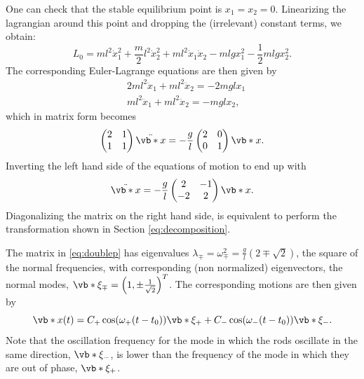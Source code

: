 \documentclass[english,fontsize=11pt,paper=b5]{scrbook}
\theoremstyle{definition}
\begin{document}
    One can check that the stable equilibrium point is $x_1 = x_2 = 0$.
    Linearizing the lagrangian around this point and dropping the (irrelevant) constant terms, we obtain:
    \begin{equation}
      L_0 = m l^2 \dot x_1^2
      + \frac m2 l^2 \dot x_2^2
      + m l^2 \dot x_1 \dot x_2
      - ml g x_1^2
      - \frac12 mlg x_2^2.
    \end{equation}
    The corresponding Euler-Lagrange equations are then given by
    \begin{align}
   & 2ml^2 \ddot x_1 + ml^2 \ddot x_2 = -2mgl x_1 \\
   & ml^2 \ddot x_1 + ml^2 \ddot x_2 = -mgl x_2,
    \end{align}
    which in matrix form becomes
    \begin{equation}
      \begin{pmatrix}2&1\\1&1\end{pmatrix} \ddot{\vb*{x}}
      = - \frac gl \begin{pmatrix}2&0\\0&1\end{pmatrix} \vb*{x}.
    \end{equation}
    Inverting the left hand side of the equations of motion to end up with
    \begin{equation}\label{eq:doublep}
      \ddot{\vb*{x}} = - \frac gl \begin{pmatrix}2&-1\\-2&2\end{pmatrix} \vb*{x}.
    \end{equation}
    Diagonalizing the matrix on the right hand side, is equivalent to perform the transformation shown in Section \ref{eq:decomposition}.

    The matrix in \eqref{eq:doublep} has eigenvalues $\lambda_\mp = \omega_\mp^2 = \frac{g}l \left(2\mp \sqrt{2}\right)$, the square of the normal frequencies, with corresponding (non normalized) eigenvectors, the normal modes, $\vb*{\xi}_\mp = \left(1, \pm \frac1{\sqrt{2}}\right)^T$.
    The corresponding motions are then given by
    \begin{equation}
      \vb*{x}(t) = C_+  \cos (\omega_+ (t - t_0)) \vb*{\xi}_+ + C_- \cos (\omega_- (t - t_0)) \vb*{\xi}_-.
    \end{equation}
    Note that the oscillation frequency for the mode in which the rods oscillate in the same direction, $\vb*{\xi}_-$, is lower than the frequency of the mode in which they are out of phase, $\vb*{\xi}_+$.
\end{document}
